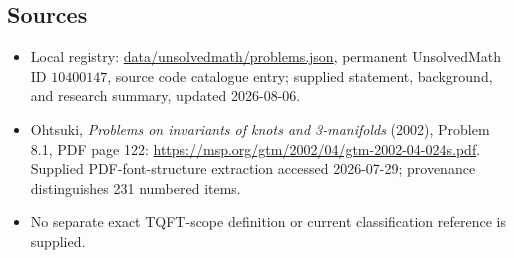 \documentclass[11pt]{article}
\begin{document}
\subsection{Sources}
\begin{itemize}
\item Local registry: \url{data/unsolvedmath/problems.json}, permanent UnsolvedMath ID \(10400147\), source code catalogue entry; supplied statement, background, and research summary, updated 2026-08-06.
\item Ohtsuki, \emph{Problems on invariants of knots and 3-manifolds} (2002), Problem 8.1, PDF page 122: \url{https://msp.org/gtm/2002/04/gtm-2002-04-024s.pdf}. Supplied PDF-font-structure extraction accessed 2026-07-29; provenance distinguishes 231 numbered items.
\item No separate exact TQFT-scope definition or current classification reference is supplied.
\end{itemize}
\end{document}
